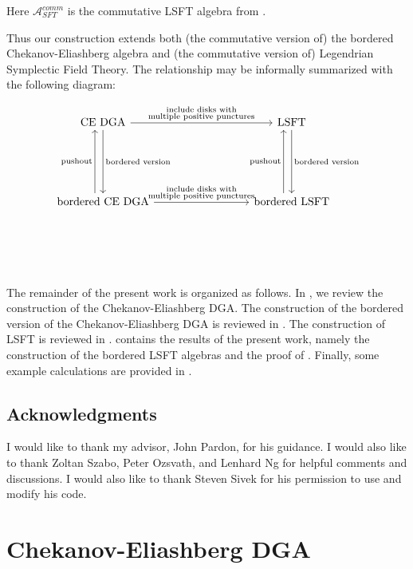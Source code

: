 \documentclass[a4paper,final, reqno]{amsart}
\theoremstyle{plain}
\theoremstyle{definition}
\newcommand{\A}{\mathcal{A}}
\begin{document}
	Here $\A^{comm}_{SFT}$ is the commutative LSFT algebra from \cite{ng}. 
	
	Thus our construction extends both (the commutative version of) the bordered Chekanov-Eliashberg algebra and (the commutative version of) Legendrian Symplectic Field Theory. The relationship may be informally summarized with the following diagram:
	
	\[\begin{tikzcd}[row sep=2cm, column sep = 3cm]
		\text{CE DGA} \arrow[r, "\substack{\text{include disks with} \\ \text{multiple positive punctures}}"] \arrow[d, "\text{bordered version}"] & \text{LSFT} \arrow[d, "\text{bordered version}"] \\
		\text{bordered CE DGA} \arrow[r, "\substack{\text{include disks with} \\ \text{multiple positive punctures}}"]  \arrow[u,"\text{pushout}",shift left=3]          & \text{bordered LSFT} \arrow[u,"\text{pushout}", shift left=3] \\
	\end{tikzcd} \]
	
	
	
	The remainder of the present work is organized as follows. In , we review the construction of the Chekanov-Eliashberg DGA. The construction of the bordered version of the Chekanov-Eliashberg DGA is reviewed in . The construction of LSFT is reviewed in .  contains the results of the present work, namely the construction of the bordered LSFT algebras and the proof of . Finally, some example calculations are provided in .
	
	
	
	\subsection*{Acknowledgments}
	
	I would like to thank my advisor, John Pardon, for his guidance. I would also like to thank Zoltan Szabo, Peter Ozsvath, and Lenhard Ng for helpful comments and discussions. I would also like to thank Steven Sivek for his permission to use and modify his code.
	
	
	
	\section{Chekanov-Eliashberg DGA}\label{sec:cedga}
	
\end{document}
